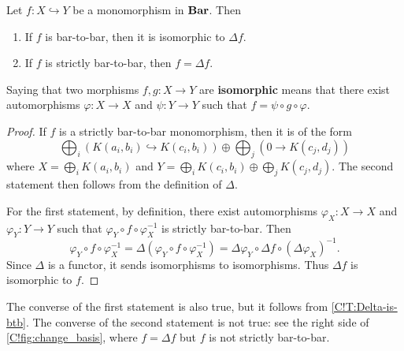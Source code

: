\begin{corollary}
\label{C!C:Delta-idempot}
  Let $f \colon X \hookrightarrow Y$ be a monomorphism in $\Bar$. Then
  \begin{enumerate}
    \item If $f$ is bar-to-bar, then it is isomorphic to $\Delta f$.
    \item If $f$ is strictly bar-to-bar, then $f = \Delta f$.
  \end{enumerate}
\end{corollary}

Saying that two morphisms $f, g \colon X \to Y$ are \textbf{isomorphic} means that there exist automorphisms $\varphi \colon X \to X$ and $\psi \colon Y \to Y$ such that $f = \psi \circ g \circ \varphi$.

\begin{proof}
  If $f$ is a strictly bar-to-bar monomorphism, then it is of the form
  \[
    \bigoplus_i (K(a_i, b_i) \hookrightarrow K(c_i, b_i)) \oplus \bigoplus_j (0 \to K(c_j, d_j))
  \]
  where $X = \bigoplus_i K(a_i, b_i)$ and $Y = \bigoplus_i K(c_i, b_i) \oplus \bigoplus_j K(c_j, d_j)$. The second statement then follows from the definition of $\Delta$.

  For the first statement, by definition, there exist automorphisms $\varphi_X \colon X \to X$ and $\varphi_Y \colon Y \to Y$ such that $\varphi_Y \circ f \circ \varphi_X^{-1}$ is strictly bar-to-bar. Then
  \[
    \varphi_Y \circ f \circ \varphi_X^{-1} = \Delta(\varphi_Y \circ f \circ \varphi_X^{-1}) = \Delta \varphi_Y \circ \Delta f \circ (\Delta \varphi_X)^{-1}.
  \]
  Since $\Delta$ is a functor, it sends isomorphisms to isomorphisms. Thus $\Delta f$ is isomorphic to $f$.
\end{proof}

\begin{remark}
  The converse of the first statement is also true, but it follows from \cref{C!T:Delta-is-btb}. The converse of the second statement is not true: see the right side of \cref{C!fig:change_basis}, where $f = \Delta f$ but $f$ is not strictly bar-to-bar.
\end{remark}

